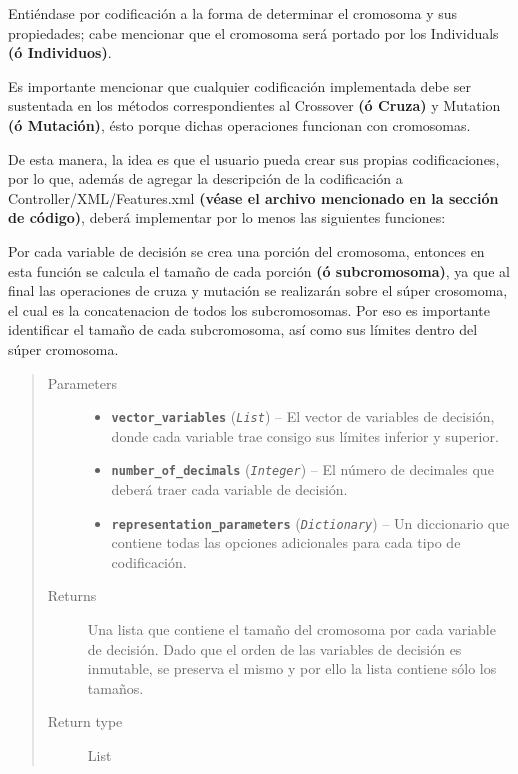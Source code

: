 \documentclass[letterpaper,10pt,english]{sphinxmanual}
\begin{document}
Entiéndase por codificación a la forma de determinar el cromosoma y sus propiedades;
cabe mencionar que el cromosoma será portado por los Individuals \textbf{(ó Individuos)}.

Es importante mencionar que cualquier codificación implementada debe ser sustentada
en los métodos correspondientes al Crossover \textbf{(ó Cruza)} y Mutation \textbf{(ó Mutación)},
ésto porque dichas operaciones funcionan con cromosomas.

De esta manera, la idea es que el usuario pueda crear sus propias codificaciones,
por lo que, además de agregar la descripción de la codificación a Controller/XML/Features.xml
\textbf{(véase el archivo mencionado en la sección de código)}, deberá implementar por
lo menos las siguientes funciones:


\begin{fulllineitems}
Por cada variable de decisión se crea una porción del cromosoma, entonces en esta función se calcula
el tamaño de cada porción \textbf{(ó subcromosoma)}, ya que al final las operaciones de cruza y mutación se realizarán
sobre el súper crosomoma, el cual es la concatenacion de todos los subcromosomas. Por eso es importante identificar
el tamaño de cada subcromosoma, así como sus límites dentro del súper cromosoma.
\begin{quote}\begin{description}
\item[{Parameters}] \leavevmode\begin{itemize}
\item {} 
\textbf{\texttt{vector\_variables}} (\emph{\texttt{List}}) -- El vector de variables de decisión, donde cada variable trae consigo sus límites inferior
y superior.

\item {} 
\textbf{\texttt{number\_of\_decimals}} (\emph{\texttt{Integer}}) -- El número de decimales que deberá traer cada variable de decisión.

\item {} 
\textbf{\texttt{representation\_parameters}} (\emph{\texttt{Dictionary}}) -- Un diccionario que contiene todas las opciones adicionales para cada tipo de
codificación.

\end{itemize}

\item[{Returns}] \leavevmode
Una lista que contiene el tamaño del cromosoma por cada variable de decisión. Dado que el orden de las
variables de decisión es inmutable, se preserva el mismo y por ello la lista contiene sólo los tamaños.

\item[{Return type}] \leavevmode
List

\end{description}\end{quote}

\end{fulllineitems}
\end{document}
